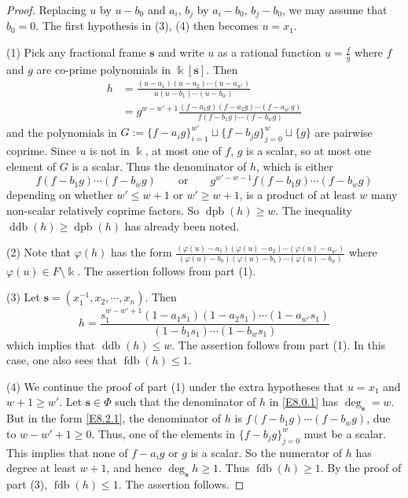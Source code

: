 \documentclass[12pt]{amsart}
\theoremstyle{plain}
\numberwithin{theorem}{section}
\numberwithin{equation}{theorem}
\theoremstyle{definition}
\newcommand{\bfs}{\mathbf{s}}
\DeclareMathOperator{\ddb}{ddb}
\DeclareMathOperator{\dpb}{dpb}
\DeclareMathOperator{\fdb}{fdb}
\begin{document}
\begin{proof}
Replacing $u$ by $u-b_0$ and $a_i$, $b_j$ by $a_i-b_0$, $b_j-b_0$, we may assume that $b_0=0$.  The first hypothesis in (3), (4) then becomes $u = x_1$.

(1) Pick any fractional frame $\bfs$ and write $u$ as a 
rational function $u=\frac{f}{g}$ where $f$ and $g$ are 
co-prime polynomials in $\Bbbk[\bfs]$. Then 
\begin{equation}  
\label{E8.2.1}\tag{E8.2.1}
\begin{aligned}
h&=\frac{(u-a_1)(u-a_2)\cdots (u-a_{w'})}{u(u-b_1)\cdots (u-b_w)}\\
 &=g^{w-w'+1}\frac{(f-a_1 g)(f-a_2 g)
 \cdots (f-a_{w'}g)}{f(f-b_1 g)\cdots (f-b_w g)}
\end{aligned}
\end{equation}
and the polynomials in $G:=\{f-a_i g\}_{i=1}^{w'}\sqcup 
\{f-b_j g\}_{j=0}^{w}\sqcup\{g\}$ are pairwise coprime. 
Since $u$ is not in $\Bbbk$, at most one of $f$, $g$ is a scalar, so at most one element of $G$
is a scalar. Thus the denominator of $h$, which is either
$$
f(f-b_1 g)\cdots (f-b_w g) \qquad\text{or} 
\qquad g^{w'-w-1}f(f-b_1 g)\cdots (f-b_w g)
$$
depending on whether $w' \le w+1$ or $w'\geq w+1$, is a product 
of at least $w$ many non-scalar relatively coprime factors. So 
$\dpb(h)\geq w$. The inequality $\ddb(h)\geq \dpb(h)$ has 
already been noted.

(2) Note that $\varphi(h)$ has the form 
$\frac{(\varphi(u)-a_1)(\varphi(u)-a_2)\cdots (\varphi(u)-a_{w'})}
{(\varphi(u)-b_0)(\varphi(u)-b_1)\cdots (\varphi(u)-b_w)}$
where $\varphi(u)\in F\setminus \Bbbk$. The assertion follows 
from part (1).

(3) Let $\bfs =(x_1^{-1}, x_2,\cdots,x_n)$. Then
$$h=\frac{s_1^{w-w'+1}(1-a_1 s_1)(1-a_{2}s_1)\cdots (1-a_{w'}s_1)}
{(1-b_1 s_1)\cdots (1-b_w s_1)}$$
which implies that $\ddb(h)\leq w$. The assertion follows from 
part (1). In this case, one also sees that $\fdb(h)\leq 1$. 

(4) We continue the proof of part (1) under the extra hypotheses 
that $u=x_1$ and $w+1\geq w'$. Let $\bfs \in \Phi$ such that the 
denominator of $h$ in \eqref{E8.0.1} has $\deg_{\bfs} = w$. But 
in the form \eqref{E8.2.1}, the denominator of $h$ is 
$f(f-b_1 g)\cdots (f-b_w g)$, due to $w-w'+1 \ge 0$. Thus, one 
of the elements in $\{f-b_j g\}_{j=0}^w$ must be a scalar. This 
implies that none of $f-a_i g $ or $g$ is a scalar. So the 
numerator of $h$ has degree at least $w+1$, and hence 
$\deg_{\bfs} h \ge 1$. Thus $\fdb(h)\geq 1$. By the proof of 
part (3), $\fdb(h)\leq 1$. The assertion follows.
\end{proof}
\end{document}
